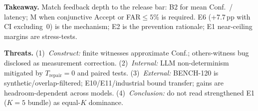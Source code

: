 \textbf{Takeaway.}
Match feedback depth to the release bar: B2 for mean Conf.\ / latency; M when
conjunctive $\mathrm{Accept}$ or FAR${\le}5\%$ is required.
E6 (+7.7\,pp with CI excluding~0) is the mechanism; E2 is the prevention
rationale; E1 near-ceiling margins are stress-tests.

\textbf{Threats.}
(1)~\emph{Construct:} finite witnesses approximate Conf.; others-witness bug
disclosed as measurement correction.
(2)~\emph{Internal:} LLM non-determinism mitigated by $T_\text{repair}{=}0$ and
paired tests.
(3)~\emph{External:} BENCH-120 is synthetic/overlap-filtered; E10/E11/industrial
bound transfer; gains are headroom-dependent across models.
(4)~\emph{Conclusion:} do not read strengthened E1 ($K{=}5$ bundle) as
equal-$K$ dominance.
